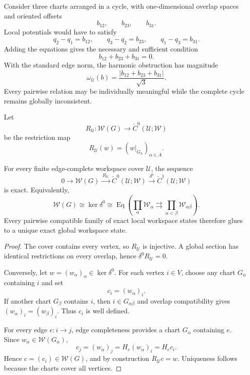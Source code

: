 
Consider three charts arranged in a cycle, with one-dimensional overlap
spaces and oriented offsets
\[
b_{12},\qquad b_{23},\qquad b_{31}.
\]
Local potentials would have to satisfy
\[
q_2-q_1=b_{12},
\qquad
q_3-q_2=b_{23},
\qquad
q_1-q_3=b_{31}.
\]
Adding the equations gives the necessary and sufficient condition
\[
\boxed{
b_{12}+b_{23}+b_{31}=0.}
\]
With the standard edge norm, the harmonic obstruction has magnitude
\[
\boxed{
\omega_{\mathcal U}(b)
=
\frac{|b_{12}+b_{23}+b_{31}|}{\sqrt3}.
}
\]
Every pairwise relation may be individually meaningful while the complete
cycle remains globally inconsistent.


Let
\[
R_{\mathcal U}:\mathscr W(G)
\longrightarrow
\check C^0(\mathcal U;\mathscr W)
\]
be the restriction map
\[
R_{\mathcal U}(w)
=
(w|_{G_\alpha})_{\alpha\in A}.
\]

\begin{theorem}\label{thm:exact-workspace-gluing}
For every finite edge-complete workspace cover \(\mathcal U\), the sequence
\[
\boxed{
0
\longrightarrow
\mathscr W(G)
\xrightarrow{\ R_{\mathcal U}\ }
\check C^0(\mathcal U;\mathscr W)
\xrightarrow{\ \delta^0\ }
\check C^1(\mathcal U;\mathscr W)
}
\]
is exact. Equivalently,
\[
\boxed{
\mathscr W(G)
\cong
\ker\delta^0
\cong
\operatorname{Eq}
\left(
\prod_\alpha\mathscr W_\alpha
\rightrightarrows
\prod_{\alpha<\beta}\mathscr W_{\alpha\beta}
\right).
}
\]
Every pairwise compatible family of exact local workspace states therefore
glues to a unique exact global workspace state.
\end{theorem}

\begin{proof}
The cover contains every vertex, so \(R_{\mathcal U}\) is injective. A global
section has identical restrictions on every overlap, hence
\(\delta^0R_{\mathcal U}=0\).

Conversely, let \(w=(w_\alpha)_\alpha\in\ker\delta^0\). For each vertex
\(i\in V\), choose any chart \(G_\alpha\) containing \(i\) and set
\[
c_i=(w_\alpha)_i.
\]
If another chart \(G_\beta\) contains \(i\), then \(i\in G_{\alpha\beta}\)
and overlap compatibility gives
\((w_\alpha)_i=(w_\beta)_i\). Thus \(c_i\) is well defined.

For every edge \(e:i\to j\), edge completeness provides a chart
\(G_\alpha\) containing \(e\). Since \(w_\alpha\in\mathscr W(G_\alpha)\),
\[
c_j=(w_\alpha)_j=H_e(w_\alpha)_i=H_ec_i.
\]
Hence \(c=(c_i)\in\mathscr W(G)\), and by construction
\(R_{\mathcal U}c=w\). Uniqueness follows because the charts cover all
vertices.
\end{proof}

